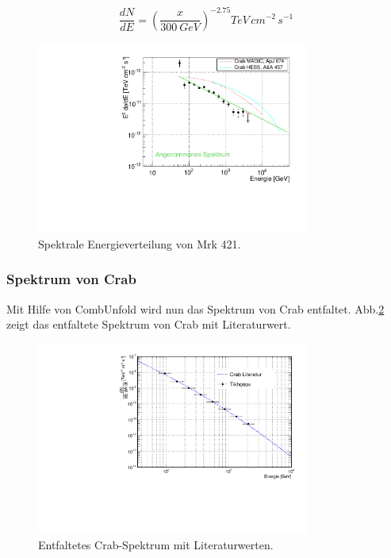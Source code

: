 \begin{equation}
\frac{dN}{dE}=\left(\frac{x}{\SI{300}{GeV}}\right)^{-2.75}\si{TeV\,cm^{-2}\,s^{-1}}
\end{equation}


\begin{figure}
    \centering
    \includegraphics[width=0.8\textwidth]{./Plots/04_MrkAnalyse/Datenset2/SED_Mrk421.pdf}
    \caption{Spektrale Energieverteilung von Mrk 421.}
    \label{Datenset2_SED_Mrk421}
\end{figure}


\subsubsection{Spektrum von Crab}
Mit Hilfe von CombUnfold wird nun das Spektrum von Crab entfaltet.
Abb.\ref{Datenset2_CombunFold_Crab} zeigt das entfaltete Spektrum von Crab mit Literaturwert.

\begin{figure}
    \centering
    \includegraphics[width=0.8\textwidth]{./Plots/04_MrkAnalyse/Datenset2/Crab_mit_Literatur.pdf}
    \caption{Entfaltetes Crab-Spektrum mit Literaturwerten.}
    \label{Datenset2_CombunFold_Crab}
\end{figure}

